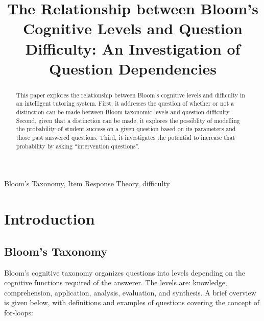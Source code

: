 \documentclass[]{interact}
\theoremstyle{plain}
\theoremstyle{definition}
\theoremstyle{remark}
\begin{document}

\title{
 The Relationship between Bloom's Cognitive Levels and Question Difficulty:
   An Investigation of Question Dependencies
}

\author{
}

\maketitle

\begin{abstract}
  This paper explores the relationship between Bloom's cognitive levels and
  difficulty in an intelligent tutoring system.  First, it addresses the
  question of whether or not a distinction can be made between Bloom taxonomic
  levels and question difficulty.  Second, given that a distinction can be
  made, it explores the possiblity of modelling the probability of student
  success on a given question based on its parameters and those past answered
  questions.  Third, it investigates the potential to increase that probability
  by asking ``intervention questions''. 
\end{abstract}

\begin{keywords}
Bloom's Taxonomy, Item Response Theory, difficulty
\end{keywords}

\section{Introduction}

\subsection{Bloom's Taxonomy}

Bloom's cognitive taxonomy organizes questions into levels depending on the
cognitive functions required of the answerer.  The levels are: knowledge,
comprehension, application, analysis, evaluation, and synthesis.  A brief
overview is given below, with definitions and examples of questions covering
the concept of for-loops:
\end{document}
